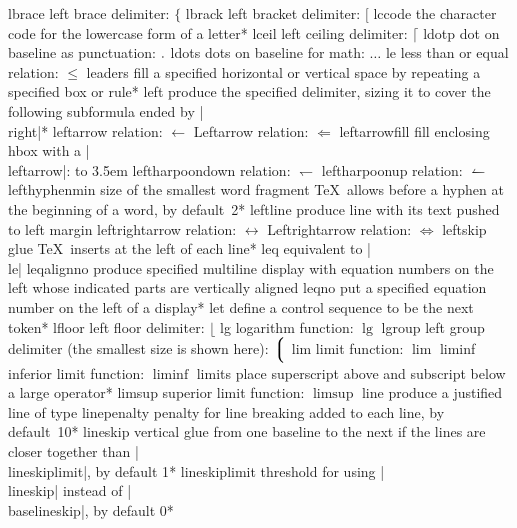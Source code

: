 \capcs lbrace {left brace delimiter: $\lbrace$}{}{}
\capcs lbrack {left bracket delimiter: $\lbrack$}{}{}
\capcs lccode {the character code for the lowercase form of a letter}*{}
\capcs lceil {left ceiling delimiter: $\lceil$}{}{}
\capcs ldotp {dot on baseline as punctuation: $\ldotp$}{}{}
\capcs ldots {dots on baseline for math: $\ldots$}{}{}
\capcs le {less than or equal relation: $\le$}{}{}
\capcs leaders {fill a specified horizontal or vertical space by repeating a
   specified box or rule}*{}
\capcs left {produce the specified delimiter, sizing it to cover the
   following subformula ended by |\\right|}*{}
\capcs leftarrow {relation: $\leftarrow$}{}{}
\capcs Leftarrow {relation: $\Leftarrow$}{}{}
\capcs leftarrowfill {fill enclosing hbox with a |\\leftarrow|:
   \hbox to 3.5em{\leftarrowfill}}{}{}
\capcs leftharpoondown {relation: $\leftharpoondown$}{}{}
\capcs leftharpoonup {relation: $\leftharpoonup$}{}{}
\capcs lefthyphenmin {size of the smallest word fragment \TeX\ allows
   before a hyphen at the beginning of a word, by default~2}*{}
\capcs leftline {produce line with its text pushed to left margin}{}{}
\capcs leftrightarrow {relation: $\leftrightarrow$}{}{}
\capcs Leftrightarrow {relation: $\Leftrightarrow$}{}{}
\capcs leftskip {glue \TeX\ inserts at the left of each line}*{}
\capcs leq {equivalent to |\\le|}{}{}
\capcs leqalignno {produce specified multiline display with equation numbers
   on the left whose indicated parts are vertically aligned}{}{}
\capcs leqno {put a specified equation number on the left of a display}*{}
\capcs let {define a control sequence to be the next token}*{}
\capcs lfloor {left floor delimiter: $\lfloor$}{}{}
\capcs lg {logarithm function: $\lg$}{}{}
\capcs lgroup {left group delimiter (the smallest size is shown here):
   $\Big\lgroup$}{}{}
\capcs lim {limit function: $\lim$}{}{}
\capcs liminf {inferior limit function: $\liminf$}{}{}
\capcs limits {place superscript above and subscript below a
   large operator}*{}
\capcs limsup {superior limit function: $\limsup$}{}{}
\capcs line {produce a justified line of type}{}{}
\capcs linepenalty {penalty for line breaking added to each line, 
   by default~10}*{}
\capcs lineskip {vertical glue from one baseline to the next if the
   lines are closer together than |\\lineskiplimit|, by default 1\pt}*{}
\capcs lineskiplimit {threshold for using |\\lineskip| instead of
   |\\base\-line\-skip|, by default 0\pt}*{}
